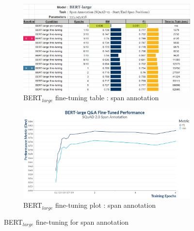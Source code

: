 \begin{figure}[ht]
	\centering
	\begin{subfigure}{0.95\textwidth}%
		\centering
		\includegraphics[width=\linewidth]{images/span/BERT_Large_Training.png}%
		\caption{BERT$_{large}$ fine-tuning table : span annotation}
	\end{subfigure}%
	
	\vspace*{8pt}%

	\begin{subfigure}{0.96\textwidth}%
		\centering
		\includegraphics[width=\linewidth]{images/QnA_BERT_Training_Performance_plot.png}%
		\caption{BERT$_{large}$ fine-tuning plot : span annotation}
	\end{subfigure}%
	\caption{\label{apdx:BERT_fine_tuning_span_annotation}BERT$_{large}$ fine-tuning for span annotation}
\end{figure}

